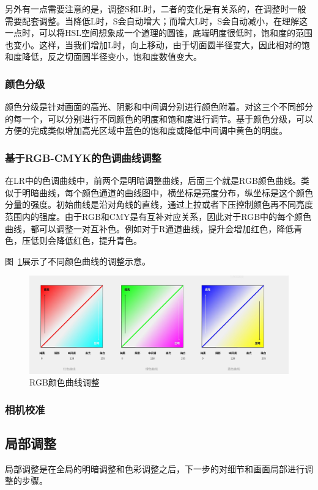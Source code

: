 \documentclass{ctexart}
\begin{document}
另外有一点需要注意的是，调整S和L时，二者的变化是有关系的，在调整时一般需要配套调整。当降低L时，S会自动增大；而增大L时，S会自动减小，在理解这一点时，可以将HSL空间想象成一个道理的圆锥，底端明度很低时，饱和度的范围也变小。这样，当我们增加L时，向上移动，由于切面圆半径变大，因此相对的饱和度降低，反之切面圆半径变小，饱和度数值变大。
\subsubsection{颜色分级}
颜色分级是针对画面的高光、阴影和中间调分别进行颜色附着。对这三个不同部分的每一个，可以分别进行不同颜色的明度和饱和度进行调节。基于颜色分级，可以方便的完成类似增加高光区域中蓝色的饱和度或降低中间调中黄色的明度。
\subsubsection{基于RGB-CMYK的色调曲线调整}
在LR中的色调曲线中，前两个是明暗调整曲线，后面三个就是RGB颜色曲线。类似于明暗曲线，每个颜色通道的曲线图中，横坐标是亮度分布，纵坐标是这个颜色分量的强度。初始曲线是沿对角线的直线，通过上拉或者下压控制颜色再不同亮度范围内的强度。由于RGB和CMY是有互补对应关系，因此对于RGB中的每个颜色曲线，都可以调整一对互补色。例如对于R通道曲线，提升会增加红色，降低青色，压低则会降低红色，提升青色。

图~\ref{fig_color_curve}展示了不同颜色曲线的调整示意。
\begin{figure}[h!]
    \centering
    \includegraphics[width=.9\linewidth]{imgs/color_curve.png}
    \caption{RGB颜色曲线调整}
    \label{fig_color_curve}
\end{figure}

\subsubsection{相机校准}

\subsection{局部调整}
局部调整是在全局的明暗调整和色彩调整之后，下一步的对细节和画面局部进行调整的步骤。
\end{document}
